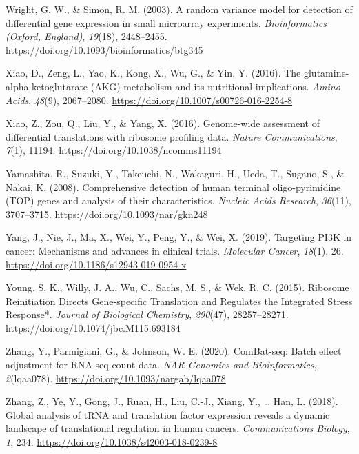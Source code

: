 \documentclass[12pt,openany]{book}
\begin{document}
\hypertarget{ref-Wright2003}{}
Wright, G. W., \& Simon, R. M. (2003). A random variance model for
detection of differential gene expression in small microarray
experiments. \emph{Bioinformatics (Oxford, England)}, \emph{19}(18),
2448--2455. \url{https://doi.org/10.1093/bioinformatics/btg345}

\hypertarget{ref-Xiao2016a}{}
Xiao, D., Zeng, L., Yao, K., Kong, X., Wu, G., \& Yin, Y. (2016). The
glutamine-alpha-ketoglutarate (AKG) metabolism and its nutritional
implications. \emph{Amino Acids}, \emph{48}(9), 2067--2080.
\url{https://doi.org/10.1007/s00726-016-2254-8}

\hypertarget{ref-Xiao2016}{}
Xiao, Z., Zou, Q., Liu, Y., \& Yang, X. (2016). Genome-wide assessment
of differential translations with ribosome profiling data. \emph{Nature
Communications}, \emph{7}(1), 11194.
\url{https://doi.org/10.1038/ncomms11194}

\hypertarget{ref-Yamashita2008}{}
Yamashita, R., Suzuki, Y., Takeuchi, N., Wakaguri, H., Ueda, T., Sugano,
S., \& Nakai, K. (2008). Comprehensive detection of human terminal
oligo-pyrimidine (TOP) genes and analysis of their characteristics.
\emph{Nucleic Acids Research}, \emph{36}(11), 3707--3715.
\url{https://doi.org/10.1093/nar/gkn248}

\hypertarget{ref-Yang2019}{}
Yang, J., Nie, J., Ma, X., Wei, Y., Peng, Y., \& Wei, X. (2019).
Targeting PI3K in cancer: Mechanisms and advances in clinical trials.
\emph{Molecular Cancer}, \emph{18}(1), 26.
\url{https://doi.org/10.1186/s12943-019-0954-x}

\hypertarget{ref-Young2015}{}
Young, S. K., Willy, J. A., Wu, C., Sachs, M. S., \& Wek, R. C. (2015).
Ribosome Reinitiation Directs Gene-specific Translation and Regulates
the Integrated Stress Response*. \emph{Journal of Biological Chemistry},
\emph{290}(47), 28257--28271.
\url{https://doi.org/10.1074/jbc.M115.693184}

\hypertarget{ref-Zhang2020}{}
Zhang, Y., Parmigiani, G., \& Johnson, W. E. (2020). ComBat-seq: Batch
effect adjustment for RNA-seq count data. \emph{NAR Genomics and
Bioinformatics}, \emph{2}(lqaa078).
\url{https://doi.org/10.1093/nargab/lqaa078}

\hypertarget{ref-Zhang2018}{}
Zhang, Z., Ye, Y., Gong, J., Ruan, H., Liu, C.-J., Xiang, Y., \ldots{}
Han, L. (2018). Global analysis of tRNA and translation factor
expression reveals a dynamic landscape of translational regulation in
human cancers. \emph{Communications Biology}, \emph{1}, 234.
\url{https://doi.org/10.1038/s42003-018-0239-8}
\end{document}
